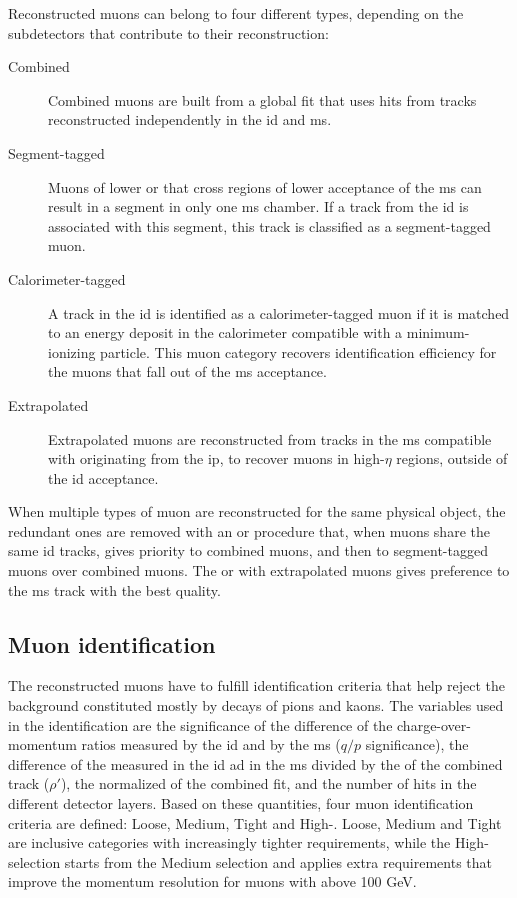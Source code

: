 Reconstructed muons can belong to four different types, depending on the subdetectors that contribute to their reconstruction:

\begin{description}
\item [Combined] Combined muons are built from a global fit that uses hits from tracks reconstructed independently in the \gls{id} and \gls{ms}.
\item[Segment-tagged] Muons of lower \pt or that cross regions of lower acceptance of the \gls{ms} can result in a segment in only one \gls{ms} chamber. If a track from the \gls{id} is associated with this segment, this track is classified as a segment-tagged muon.
\item[Calorimeter-tagged] A track in the \gls{id} is identified as a calorimeter-tagged muon if it is matched to an energy deposit in the calorimeter compatible with a minimum-ionizing particle. This muon category recovers identification efficiency for the muons that fall out of the \gls{ms} acceptance.
\item[Extrapolated] Extrapolated muons are reconstructed from tracks in the \gls{ms} compatible with originating from the \gls{ip}, to recover muons in high-$\eta$ regions, outside of the \gls{id} acceptance.
\end{description}

When multiple types of muon are reconstructed for the same physical object, the redundant ones are removed with an \gls{or} procedure that, when muons share the same \gls{id} tracks, gives priority to combined muons, and then to segment-tagged muons over combined muons. The \gls{or} with extrapolated muons gives preference to the \gls{ms} track with the best quality.

\subsection{Muon identification}
\label{sec:muon_id}

The reconstructed muons have to fulfill identification criteria that help reject the background constituted mostly by decays of pions and kaons. 
The variables used in the identification are the significance of the difference of the charge-over-momentum ratios measured by the \gls{id} and by the \gls{ms} ($q/p$ significance),
the difference of the \pt measured in the \gls{id} ad in the \gls{ms} divided by the \pt of the combined track ($\rho'$),
the normalized \chis of the combined fit,
and the number of hits in the different detector layers. 
Based on these quantities, four muon identification criteria are defined: Loose, Medium, Tight and High-\pt. 
Loose, Medium and Tight are inclusive categories with increasingly tighter requirements, while the High-\pt selection starts from the Medium selection and applies extra requirements that improve the momentum resolution for muons with \pt above 100 GeV.

